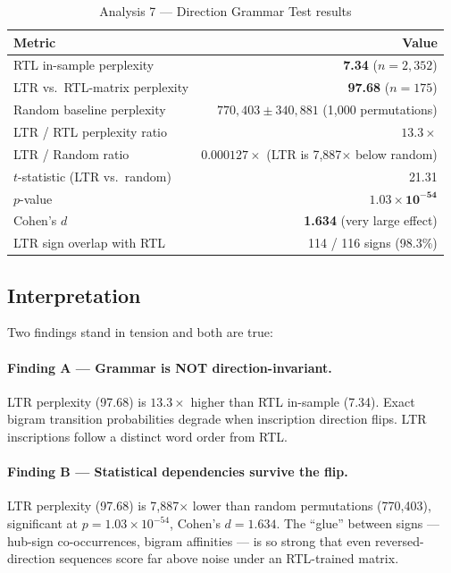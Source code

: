 \documentclass[12pt,letterpaper]{article}
\begin{document}
\begin{table}[htbp]
\centering
\caption{Analysis 7 --- Direction Grammar Test results}
\begin{tabular}{lr}
\toprule
Metric & Value \\
\midrule
RTL in-sample perplexity         & \textbf{7.34}  ($n = 2{,}352$) \\
LTR vs.\ RTL-matrix perplexity   & \textbf{97.68} ($n = 175$) \\
Random baseline perplexity       & $770{,}403 \pm 340{,}881$ (1,000 permutations) \\
\addlinespace
LTR / RTL perplexity ratio       & $13.3\times$ \\
LTR / Random ratio               & $0.000127\times$ (LTR is 7,887$\times$ below random) \\
\addlinespace
$t$-statistic (LTR vs.\ random)  & 21.31 \\
$p$-value                        & $\mathbf{1.03 \times 10^{-54}}$ \\
Cohen's $d$                      & \textbf{1.634} (very large effect) \\
\addlinespace
LTR sign overlap with RTL        & 114 / 116 signs (98.3\%) \\
\bottomrule
\end{tabular}
\end{table}

\subsection{Interpretation}

Two findings stand in tension and both are true:

\paragraph{Finding A --- Grammar is NOT direction-invariant.}
LTR perplexity (97.68) is $13.3\times$ higher than RTL in-sample
(7.34).
Exact bigram transition probabilities degrade when inscription
direction flips.
LTR inscriptions follow a distinct word order from RTL.

\paragraph{Finding B --- Statistical dependencies survive the flip.}
LTR perplexity (97.68) is 7,887$\times$ lower than random permutations
(770,403), significant at $p = 1.03 \times 10^{-54}$, Cohen's
$d = 1.634$.
The ``glue'' between signs --- hub-sign co-occurrences, bigram
affinities --- is so strong that even reversed-direction sequences
score far above noise under an RTL-trained matrix.
\end{document}
